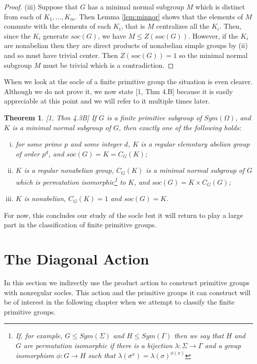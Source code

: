\documentclass[]{article}
\newtheorem{thm}{Theorem}[section]
\theoremstyle{definition}
\begin{document}
\begin{proof}
(iii) Suppose that $G$ has a minimal normal subgroup $M$ which is distinct from each of $K_1,\dots,K_m$. Then Lemma \ref{lem:minnor} shows that the elements of $M$ commute with the elements of each $K_i$, that is $M$ centralizes all the $K_i$. Then, since the $K_i$ generate $soc(G)$, we have $M \leqslant Z(soc(G))$. However, if the $K_i$ are nonabelian then they are direct products of nonabelian simple groups by (ii) and so must have trivial center. Then $Z(soc(G))=1$ so the minimal normal subgroup $M$ must be trivial which is a contradiction.
\end{proof}

When we look at the socle of a finite primitive group the situation is even clearer. Although we do not prove it, we now state [1, Thm 4.B] because it is easily appreciable at this point and we will refer to it multiple times later.

\begin{thm} \label{thm:DM4.3B} \emph{[1, Thm 4.3B]}
	If $G$ is a finite primitive subgroup of $Sym(\Omega)$, and $K$ is a minimal normal subgroup of $G$, then exactly one of the following holds:
	\begin{enumerate} [(i)]
	\item for some prime $p$ and some integer $d$, $K$ is a regular elemntary abelian group of order $p^d$, and $soc(G) = K = C_G(K)$;
	\item $K$ is a regular nonabelian group, $C_G(K)$ is a minimal normal subgroup of $G$ which is permutation isomorphic\footnote{If, for example, $G \leqslant Sym(\Sigma)$ and $H \leqslant Sym(\Gamma)$ then we say that $H$ and $G$ are \emph{permutation isomorphic} if there is a bijection $\lambda:\Sigma \rightarrow \Gamma$ and a group isomorphism $\phi:G \rightarrow H$ such that $\lambda(\sigma^x)=\lambda(\sigma)^{\phi(x)}$} to $K$, and $soc(G) = K \times C_G(G)$;
	\item $K$ is nonabelian, $C_G(K) = 1$ and $soc(G) = K$. 
	\end{enumerate}
\end{thm}

For now, this concludes our study of the socle but it will return to play a large part in the classification of finite primitive groups. 

\clearpage
\section{The Diagonal Action} \label{sec:diagonalaction}
In this section we indirectly use the product action to construct primitive groups with nonregular socles. This action and the primitive groups it can construct will be of interest in the following chapter when we attempt to classify the finite primitive groups. \\
\end{document}
